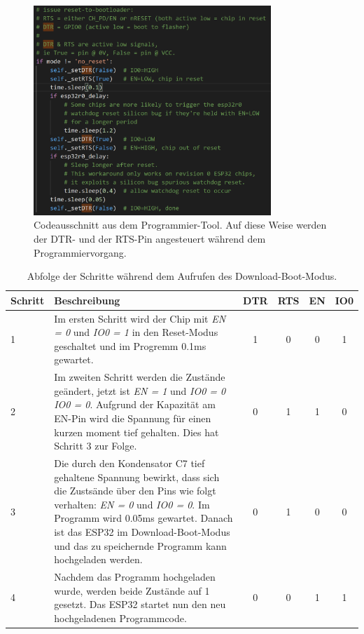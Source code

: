 \newpage
\begin{figure}[h!]
	\centering
	\includegraphics[width=0.8\textwidth]{graphics/ESP32_Boot_Code}
	\caption{Codeausschnitt aus dem Programmier-Tool. Auf diese Weise werden der DTR- und der RTS-Pin angesteuert während dem Programmiervorgang.}
	\label{fig:ESP32_Boot_Code}
\end{figure}

\begin{table}[h!]
\center
\begin{tabularx}{\textwidth}{|l|X||c|c||c|c|}
\hline
Schritt & Beschreibung & DTR & RTS & EN & IO0\\
\hline
1 & Im ersten Schritt wird der Chip mit \textit{EN = 0} und \textit{IO0 = 1} in den Reset-Modus geschaltet und im Progremm 0.1ms gewartet. & 1 & 0 & 0 & 1 \\
\hline
2 & Im zweiten Schritt werden die Zustände geändert, jetzt ist \textit{EN = 1} und \textit{IO0 = 0} \textit{IO0 = 0}. Aufgrund der Kapazität am EN-Pin wird die Spannung für einen kurzen moment tief gehalten. Dies hat Schritt 3 zur Folge. & 0 & 1 & 1 & 0 \\
\hline
3 & Die durch den Kondensator C7 tief gehaltene Spannung bewirkt, dass sich die Zustsände über den Pins wie folgt verhalten: \textit{EN = 0} und \textit{IO0 = 0}. Im Programm wird 0.05ms gewartet. Danach ist das ESP32 im Download-Boot-Modus und das zu speichernde Programm kann hochgeladen werden. & 0 & 1 & 0 & 0 \\
\hline
4 & Nachdem das Programm hochgeladen wurde, werden beide Zustände auf 1 gesetzt. Das ESP32 startet nun den neu hochgeladenen Programmcode. & 0 & 0 & 1 & 1 \\
\hline
\end{tabularx}
\caption{Abfolge der Schritte während dem Aufrufen des Download-Boot-Modus.}
\label{tab:Abfolge_Download_Boot_Modus}
\end{table}
